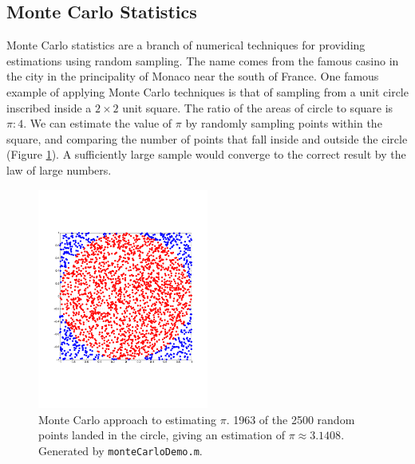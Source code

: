 \documentclass[11pt]{amsart}
\begin{document}
\subsection{Monte Carlo Statistics}

Monte Carlo statistics are a branch of numerical techniques for providing estimations using random sampling. The name comes from the famous casino in the city in the principality of Monaco near the south of France. One famous example of applying Monte Carlo techniques is that of sampling from a unit circle inscribed inside a $2 \times 2$ unit square. The ratio of the areas of circle to square is $\pi : 4$. We can estimate the value of $\pi$ by randomly sampling points within the square, and comparing the number of points that fall inside and outside the circle (Figure \ref{fig:montecarlo}). A sufficiently large sample would converge to the correct result by the law of large numbers.

\begin{figure}[!ht]
\centering
\includegraphics[width=0.5\textwidth]{Figures/montecarlo.pdf}
\caption{Monte Carlo approach to estimating $\pi$. 1963 of the 2500 random points landed in the circle, giving an estimation of $\pi \approx 3.1408$. Generated by \texttt{monteCarloDemo.m}.}
\label{fig:montecarlo}
\end{figure}
\end{document}

